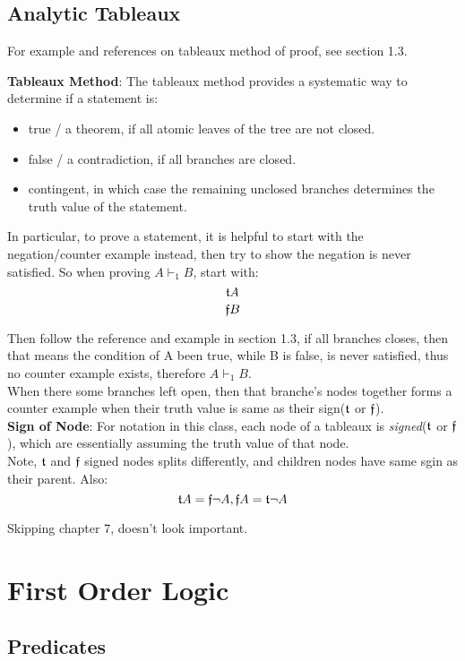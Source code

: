 \documentclass{article}
\begin{document}
\subsection{Analytic Tableaux}
For example and references on tableaux method of proof, see section 1.3.\\

\noindent
{\large

\textbf{Tableaux Method}: The tableaux method provides a systematic way to determine if a statement is:
\begin{itemize}
    \item true / a theorem, if all atomic leaves of the tree are not closed.
    \item false / a contradiction, if all branches are closed.
    \item contingent, in which case the remaining unclosed branches determines the truth value of the statement.
\end{itemize}
In particular, to prove a statement, it is helpful to start with the negation/counter example instead, then try to show 
the negation is never satisfied. So when proving $A \vdash_1 B$, start with:
$$
{\mathfrak{t}} A
$$
$$
{\mathfrak{f}} B
$$

Then follow the reference and example in section 1.3, if all branches closes, then that means the 
condition of A been true, while B is false, is never satisfied, thus no counter example exists, therefore
$A \vdash_1 B$.\\

When there some branches left open, then that branche's nodes together forms a counter example when their truth
value is same as their sign(${\mathfrak{t}}$ or ${\mathfrak{f}}$). \\

\textbf{Sign of Node}: For notation in this class, each node of a tableaux is \emph{signed}(${\mathfrak{t}}$ or ${\mathfrak{f}}$),
which are essentially assuming the truth value of that node. \\Note, ${\mathfrak{t}}$ and ${\mathfrak{f}}$ signed 
nodes splits differently, and children nodes have same sgin as their parent. Also:
$$
{\mathfrak{t}} A = {\mathfrak{f}} \lnot A, {\mathfrak{f}} A = {\mathfrak{t}} \lnot A
$$
}

Skipping chapter 7, doesn't look important.
\newpage


\section{First Order Logic}
\subsection{Predicates}
\end{document}
